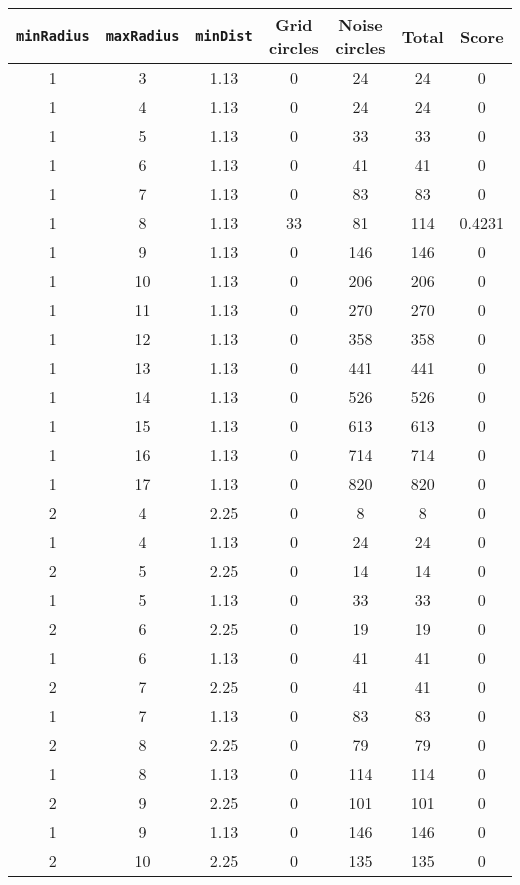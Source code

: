 \documentclass[letterpaper, 12pt]{article}
\begin{document}
\begin{longtable}{|c|c|c|c|c|c|c|}
\hline
\textbf{\texttt{minRadius}} & \textbf{\texttt{maxRadius}} & \textbf{\texttt{minDist}} & \textbf{Grid circles} & \textbf{Noise circles} & \textbf{Total} & \textbf{Score} \\
\hline
1 & 3 & 1.13 & 0 & 24 & 24 & 0 \\
\hline
1 & 4 & 1.13 & 0 & 24 & 24 & 0 \\
\hline
1 & 5 & 1.13 & 0 & 33 & 33 & 0 \\
\hline
1 & 6 & 1.13 & 0 & 41 & 41 & 0 \\
\hline
1 & 7 & 1.13 & 0 & 83 & 83 & 0 \\
\hline
1 & 8 & 1.13 & 33 & 81 & 114 & 0.4231 \\
\hline
1 & 9 & 1.13 & 0 & 146 & 146 & 0 \\
\hline
1 & 10 & 1.13 & 0 & 206 & 206 & 0 \\
\hline
1 & 11 & 1.13 & 0 & 270 & 270 & 0 \\
\hline
1 & 12 & 1.13 & 0 & 358 & 358 & 0 \\
\hline
1 & 13 & 1.13 & 0 & 441 & 441 & 0 \\
\hline
1 & 14 & 1.13 & 0 & 526 & 526 & 0 \\
\hline
1 & 15 & 1.13 & 0 & 613 & 613 & 0 \\
\hline
1 & 16 & 1.13 & 0 & 714 & 714 & 0 \\
\hline
1 & 17 & 1.13 & 0 & 820 & 820 & 0 \\
\hline
2 & 4 & 2.25 & 0 & 8 & 8 & 0 \\
\hline
1 & 4 & 1.13 & 0 & 24 & 24 & 0 \\
\hline
2 & 5 & 2.25 & 0 & 14 & 14 & 0 \\
\hline
1 & 5 & 1.13 & 0 & 33 & 33 & 0 \\
\hline
2 & 6 & 2.25 & 0 & 19 & 19 & 0 \\
\hline
1 & 6 & 1.13 & 0 & 41 & 41 & 0 \\
\hline
2 & 7 & 2.25 & 0 & 41 & 41 & 0 \\
\hline
1 & 7 & 1.13 & 0 & 83 & 83 & 0 \\
\hline
2 & 8 & 2.25 & 0 & 79 & 79 & 0 \\
\hline
1 & 8 & 1.13 & 0 & 114 & 114 & 0 \\
\hline
2 & 9 & 2.25 & 0 & 101 & 101 & 0 \\
\hline
1 & 9 & 1.13 & 0 & 146 & 146 & 0 \\
\hline
2 & 10 & 2.25 & 0 & 135 & 135 & 0 \\

\end{longtable}
\end{document}
